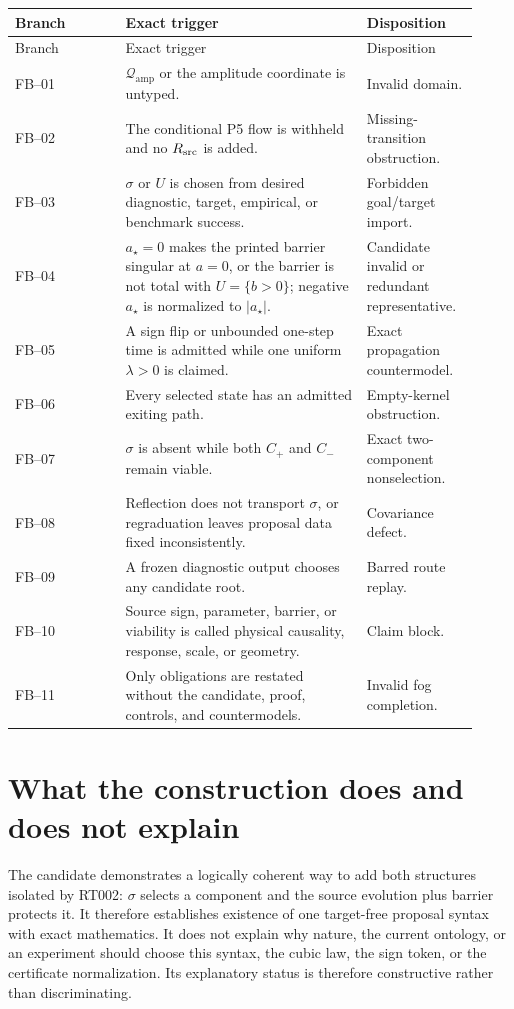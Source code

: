 \documentclass[11pt]{article}
\newcommand{\Qamp}{\mathcal Q_{\mathrm{amp}}}
\begin{document}
\begin{longtable}{P{0.22\linewidth}P{0.48\linewidth}P{0.22\linewidth}}
\toprule
Branch & Exact trigger & Disposition \\
\midrule
\endfirsthead
\toprule
Branch & Exact trigger & Disposition \\
\midrule
\endhead
FB--01 & $\Qamp$ or the amplitude coordinate is untyped. & Invalid domain.\\
FB--02 & The conditional P5 flow is withheld and no $R_{\rm src}$ is added. & Missing-transition obstruction.\\
FB--03 & $\sigma$ or $U$ is chosen from desired diagnostic, target, empirical, or benchmark success. & Forbidden goal/target import.\\
FB--04 & $a_\star=0$ makes the printed barrier singular at $a=0$, or the barrier is not total with $U=\{b>0\}$; negative $a_\star$ is normalized to $|a_\star|$. & Candidate invalid or redundant representative.\\
FB--05 & A sign flip or unbounded one-step time is admitted while one uniform $\lambda>0$ is claimed. & Exact propagation countermodel.\\
FB--06 & Every selected state has an admitted exiting path. & Empty-kernel obstruction.\\
FB--07 & $\sigma$ is absent while both $C_+$ and $C_-$ remain viable. & Exact two-component nonselection.\\
FB--08 & Reflection does not transport $\sigma$, or regraduation leaves proposal data fixed inconsistently. & Covariance defect.\\
FB--09 & A frozen diagnostic output chooses any candidate root. & Barred route replay.\\
FB--10 & Source sign, parameter, barrier, or viability is called physical causality, response, scale, or geometry. & Claim block.\\
FB--11 & Only obligations are restated without the candidate, proof, controls, and countermodels. & Invalid fog completion.\\
\bottomrule
\end{longtable}

\section{What the construction does and does not explain}

The candidate demonstrates a logically coherent way to add both structures
isolated by RT002: $\sigma$ selects a component and the source evolution plus
barrier protects it.  It therefore establishes existence of one target-free
proposal syntax with exact mathematics.  It does not explain why nature, the
current ontology, or an experiment should choose this syntax, the cubic law,
the sign token, or the certificate normalization.  Its explanatory status is
therefore constructive rather than discriminating.
\end{document}
